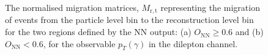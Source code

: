 \begin{figure}[ht]
    \centering
    \quad\quad

    \caption{The normalised migration matrices, $M_{\mathrm{r,t}}$ representing the migration of events from the particle level bin to the reconstruction level bin for the two regions defined by the NN output: (a) $O_{\mathrm{NN}} \geq 0.6$ 
    and (b) $O_{\mathrm{NN}} < 0.6$, for the observable $p_T(\gamma)$ in the dilepton channel.}
    \label{fig:folding_input_migration_dilep}
\end{figure}
\FloatBarrier

